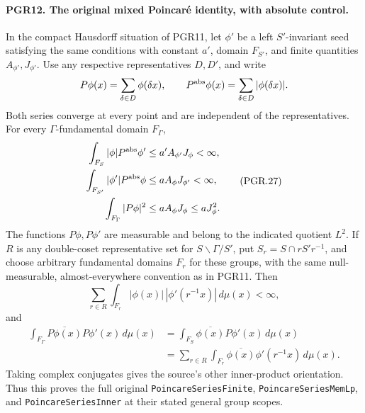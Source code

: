 \paragraph{PGR12. The original mixed Poincar\'e identity, with absolute control.}
\label{claim:PGR12}
In the compact Hausdorff situation of PGR11, let \(\phi'\) be a
left \(S'\)-invariant seed satisfying the same conditions with
constant \(a'\), domain \(F_{S'}\), and finite quantities
\(A_{\phi'},J_{\phi'}\).  Use any respective representatives
\(D,D'\), and write
\[
 P\phi(x)=\sum_{\delta\in D}\phi(\delta x),\qquad
 P^{\rm abs}\phi(x)=\sum_{\delta\in D}|\phi(\delta x)|.
\]
Both series converge at every point and are independent of the
representatives.  For every \(\Gamma\)-fundamental domain
\(F_\Gamma\),
\[
 \begin{split}
 \int_{F_S}|\phi|P^{\rm abs}\phi'
       &\leq a'A_{\phi'}J_\phi<\infty,\\
 \int_{F_{S'}}|\phi'|P^{\rm abs}\phi
       &\leq aA_\phi J_{\phi'}<\infty,\\
 \int_{F_\Gamma}|P\phi|^2
       &\leq a A_\phi J_\phi\leq aJ_\phi^2.
 \end{split}
\tag{PGR.27}
\]
The functions \(P\phi,P\phi'\) are measurable and belong to
the indicated quotient \(L^2\).  If \(R\) is any double-coset
representative set for \(S\backslash\Gamma/S'\), put
\(S_r=S\cap rS'r^{-1}\), and choose arbitrary fundamental
domains \(F_r\) for these groups, with the same null-measurable,
almost-everywhere convention as in PGR11.  Then
\[
 \sum_{r\in R}\int_{F_r}|\phi(x)|\,|\phi'(r^{-1}x)|\,d\mu(x)
                                                   <\infty,
\tag{PGR.28}
\]
and
\[
 \begin{split}
 \int_{F_\Gamma}\overline{P\phi(x)}P\phi'(x)\,d\mu(x)
   &=\int_{F_S}\overline{\phi(x)}P\phi'(x)\,d\mu(x)\\
   &=\sum_{r\in R}\int_{F_r}
          \overline{\phi(x)}\phi'(r^{-1}x)\,d\mu(x).
 \end{split}
\tag{PGR.29}
\]
Taking complex conjugates gives the source's other inner-product
orientation.  Thus this proves the full original
\texttt{PoincareSeriesFinite}, \texttt{PoincareSeriesMemLp}, and
\texttt{PoincareSeriesInner} at their stated general group scopes.


